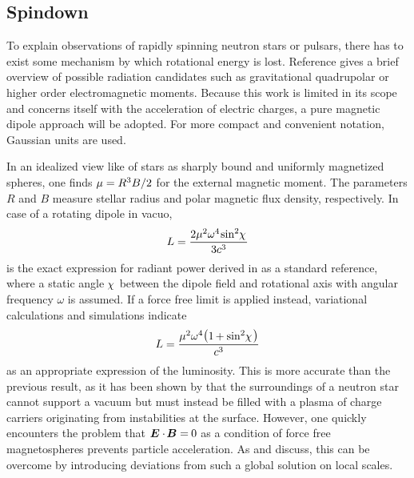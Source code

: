 \subsection{Spindown}
\label{sub:spindown}

To explain observations of rapidly spinning neutron stars or pulsars, there has to exist some mechanism by which rotational energy is
lost. Reference \cite{Alvarez_2004} gives a brief overview of possible radiation candidates such as gravitational quadrupolar or
higher order electromagnetic moments. Because this work is limited in its scope and concerns itself with the acceleration of
electric charges, a pure magnetic dipole approach will be adopted. For more compact and convenient notation, Gaussian units are used.

In an idealized view like \cite{Deutsch_1955} of stars as sharply bound and uniformly magnetized spheres, one finds
$\mu = \kern-0.1pt R^3 B / 2$ for the external magnetic moment. The parameters $R$ and $B$ measure stellar radius and polar magnetic
flux density, respectively. In case of a rotating dipole in vacuo,
\begin{equation}
	L = \frac{2\mu^2 \omega^4 \kern-1.0pt \sin^2 \kern-2.0pt \chi \kern+1.0pt}{3c^3}
	\label{eqn:vacuum}
\end{equation}
is the exact expression for radiant power derived in \cite{Jackson_1999} as a standard reference, where a static angle
$\kern-1.0pt \chi \kern+1.0pt$ between the dipole field and rotational axis with angular frequency $\omega$ is assumed. If
a force free limit is applied instead, variational calculations \cite{Gruzinov_2006} and simulations \cite{Spitkovsky_2006} indicate
\begin{equation}
	L = \frac{\mu^2 \omega^4 \raisebox{0.15ex}{\( \bigl(
	\raisebox{-0.15ex}{\( 1 \kern-0.7pt + \sin^2 \kern-2.0pt \chi \kern+1.0pt \)} \bigr) \)} }{c^3}
	\label{eqn:ffe-mhd}
\end{equation}
as an appropriate expression of the luminosity. This is more accurate than the previous result, as it has been
shown by \cite{Goldreich_1969} that the surroundings of a neutron star cannot support a vacuum but must instead be filled with a
plasma of charge carriers originating from instabilities at the surface. However, one quickly encounters the problem that
$\bm{E} \cdot \kern-1.0pt \bm{B} = \kern-0.5pt 0$ as a condition of force free magnetospheres prevents particle acceleration. As
\cite{Li_2012} and \cite{Gralla_2019} discuss, this can be overcome by introducing deviations from such a global solution on local
scales.

